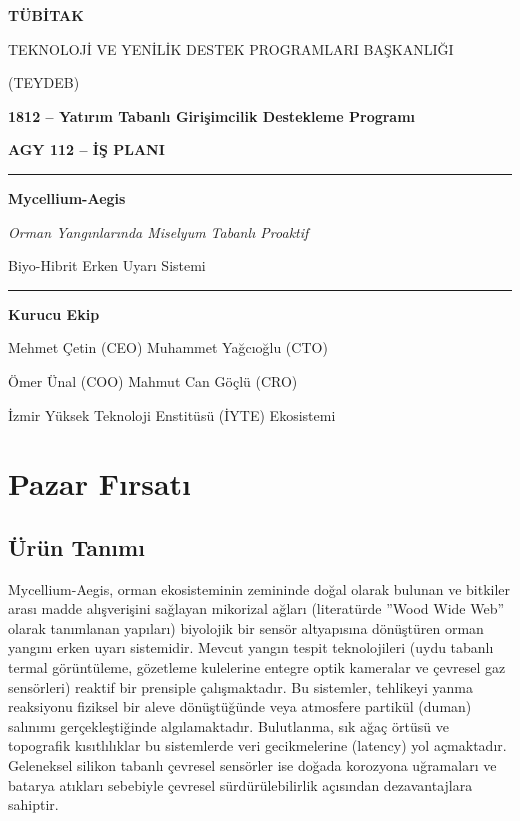 \documentclass[11pt,a4paper]{article}
\title{}
\date{}
\begin{document}
\begin{titlepage}
\centering
\vspace*{2cm}
{\large\bfseries TÜBİTAK\par}
{\large TEKNOLOJİ VE YENİLİK DESTEK PROGRAMLARI BAŞKANLIĞI\par}
{\large (TEYDEB)\par}
\vspace{1.5cm}
{\large\bfseries 1812 -- Yatırım Tabanlı Girişimcilik Destekleme Programı\par}
{\large\bfseries AGY 112 -- İŞ PLANI\par}
\vspace{2cm}
\rule{\linewidth}{0.4pt}
\vspace{1cm}
{\Huge\bfseries Mycellium-Aegis\par}
\vspace{0.8cm}
{\large\itshape Orman Yangınlarında Miselyum Tabanlı Proaktif\par
Biyo-Hibrit Erken Uyarı Sistemi\par}
\vspace{1cm}
\rule{\linewidth}{0.4pt}
\vspace{2.5cm}
{\bfseries Kurucu Ekip\par}
\vspace{0.5cm}
Mehmet Çetin (CEO) \qquad Muhammet Yağcıoğlu (CTO)\par
Ömer Ünal (COO) \qquad Mahmut Can Göçlü (CRO)\par
\vspace{1.5cm}
İzmir Yüksek Teknoloji Enstitüsü (İYTE) Ekosistemi
\vfill
\end{titlepage}

\tableofcontents
\newpage

\section{Pazar Fırsatı}

\subsection{Ürün Tanımı}

Mycellium-Aegis, orman ekosisteminin zemininde doğal olarak bulunan ve bitkiler arası madde alışverişini sağlayan mikorizal ağları (literatürde ''Wood Wide Web'' olarak tanımlanan yapıları) biyolojik bir sensör altyapısına dönüştüren orman yangını erken uyarı sistemidir. Mevcut yangın tespit teknolojileri (uydu tabanlı termal görüntüleme, gözetleme kulelerine entegre optik kameralar ve çevresel gaz sensörleri) reaktif bir prensiple çalışmaktadır. Bu sistemler, tehlikeyi yanma reaksiyonu fiziksel bir aleve dönüştüğünde veya atmosfere partikül (duman) salınımı gerçekleştiğinde algılamaktadır. Bulutlanma, sık ağaç örtüsü ve topografik kısıtlılıklar bu sistemlerde veri gecikmelerine (latency) yol açmaktadır. Geleneksel silikon tabanlı çevresel sensörler ise doğada korozyona uğramaları ve batarya atıkları sebebiyle çevresel sürdürülebilirlik açısından dezavantajlara sahiptir.
\end{document}
